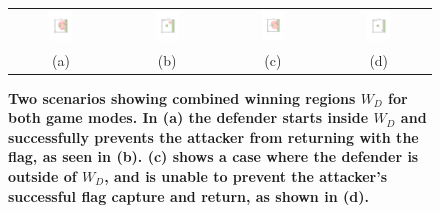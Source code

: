 \documentclass[letterpaper, 10 pt, conference]{ieeeconf}  %
\numberwithin{algorithm}{section}
\begin{document}
\setlength\tabcolsep{0.5pt}
\begin{figure}
	\centering
	\begin{tabular}{cccc}
		\includegraphics[width=0.25\textwidth]{figures/defenderWinFCFR/defenderWinFCFR1.pdf} &
		\includegraphics[width=0.25\textwidth]{figures/defenderWinFCFR/defenderWinFCFR2.pdf} &
		\includegraphics[width=0.25\textwidth]{figures/attackerWinFCFR/attackerwinFCFR1.pdf} &
		\includegraphics[width=0.25\textwidth]{figures/attackerWinFCFR/attackerwinFCFR2.pdf}\\
		(a) & (b) & (c) & (d)  \\
	\end{tabular} 
	\caption{\textbf{Two scenarios showing combined winning regions $W_D$ for both game modes. In (a) the defender starts inside $W_D$ and successfully prevents the attacker from returning with the flag, as seen in (b). (c) shows a case where the defender is outside of $W_D$, and is unable to prevent the attacker's successful flag capture and return, as shown in (d). }}
	\label{fig:combined}
\end{figure} 
\setlength\tabcolsep{6pt}
\end{document}
